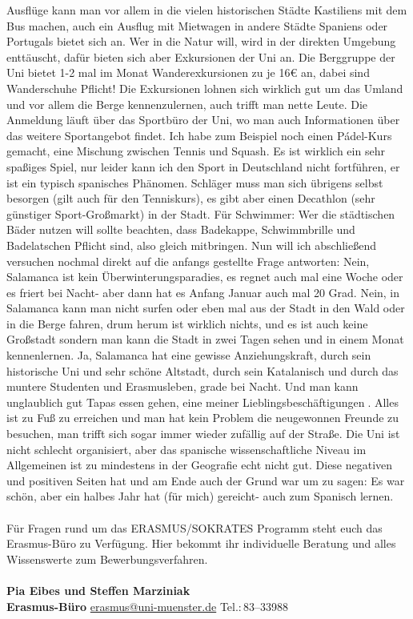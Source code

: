Ausflüge kann man vor allem in die vielen historischen Städte Kastiliens mit dem Bus machen, auch ein Ausflug mit Mietwagen in andere Städte Spaniens oder Portugals bietet sich an. Wer in die Natur will, wird in der direkten Umgebung enttäuscht, dafür bieten sich aber Exkursionen der Uni an. Die Berggruppe der Uni bietet 1-2 mal im Monat Wanderexkursionen zu je 16€ an, dabei sind Wanderschuhe Pflicht! Die Exkursionen lohnen sich wirklich gut um das Umland und vor allem die 
Berge kennenzulernen, auch trifft man nette Leute. Die Anmeldung läuft über das Sportbüro der Uni, wo man auch Informationen über das weitere Sportangebot findet. Ich habe zum Beispiel noch einen Pádel-Kurs gemacht, eine Mischung zwischen Tennis und Squash. Es ist wirklich ein sehr spaßiges Spiel, nur leider kann ich den Sport in Deutschland nicht fortführen, er ist ein typisch spanisches Phänomen. Schläger muss man sich übrigens selbst besorgen (gilt auch für den Tenniskurs), es gibt aber einen Decathlon (sehr günstiger Sport-Großmarkt) in der Stadt. Für Schwimmer: Wer die städtischen Bäder nutzen will sollte beachten, dass Badekappe, Schwimmbrille und Badelatschen Pflicht sind, also gleich mitbringen. 
Nun will ich abschließend versuchen nochmal direkt auf die anfangs gestellte Frage antworten: Nein, Salamanca ist kein Überwinterungsparadies, es regnet auch mal eine Woche oder es friert bei Nacht- aber dann hat es Anfang Januar auch mal 20 Grad. Nein, in Salamanca kann man nicht surfen oder eben mal aus der Stadt in den Wald oder in die Berge fahren, drum herum ist wirklich nichts, und es ist auch keine Großstadt sondern man kann die Stadt in zwei Tagen sehen und in einem Monat kennenlernen. 
Ja, Salamanca hat eine gewisse Anziehungskraft, durch sein historische Uni und sehr schöne Altstadt, durch sein Katalanisch und durch das muntere Studenten und Erasmusleben, grade bei Nacht. Und man kann unglaublich gut Tapas essen gehen, eine meiner Lieblingsbeschäftigungen. Alles ist zu Fuß zu erreichen und man hat kein Problem die neugewonnen Freunde zu besuchen, man trifft sich sogar immer wieder zufällig auf der Straße. Die Uni ist nicht schlecht organisiert, aber das spanische wissenschaftliche Niveau im Allgemeinen ist zu mindestens in der Geografie echt nicht gut. 
Diese negativen und positiven Seiten hat und am Ende auch der Grund war um zu sagen: Es war schön, aber ein halbes Jahr hat (für mich) gereicht- auch zum Spanisch lernen. 
 \\
\\
Für Fragen rund um das ERASMUS/SOKRATES Programm steht euch das Erasmus-Büro zu Verfügung. Hier bekommt ihr individuelle Beratung und alles Wissenswerte zum Bewerbungsverfahren.\\ \\
\textbf{Pia Eibes und Steffen Marziniak}\\
\textbf{Erasmus-Büro}   \url{erasmus@uni-muenster.de}	Tel.:\,83--33988\\ 

